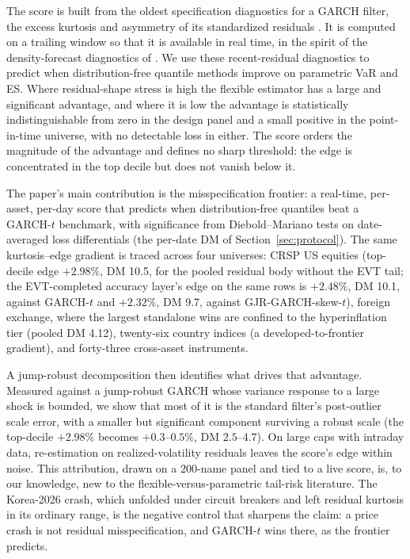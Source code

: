 \documentclass[11pt]{article}
\theoremstyle{remark}
\begin{document}
The score is built from the oldest specification diagnostics for a
GARCH filter, the excess kurtosis and asymmetry of its standardized
residuals \citep{bollerslev1987, hansen1994ARCD}. It is computed on a
trailing window so that it is available in real time, in the spirit of
the density-forecast diagnostics of \citet{berkowitz2001}. We use these recent-residual diagnostics to predict when distribution-free quantile methods improve on parametric VaR and ES. Where residual-shape stress is high the flexible estimator has a large and significant advantage, and where it is low the advantage is statistically indistinguishable from zero in the design panel and a small positive in the point-in-time universe, with no detectable loss in either. The score orders the magnitude of the advantage and defines no sharp threshold: the edge is concentrated in the top decile but does not vanish below it.

\medskip\noindent The paper's main contribution is the misspecification frontier: a real-time, per-asset, per-day score that predicts when distribution-free quantiles beat a GARCH-$t$ benchmark, with significance from Diebold--Mariano tests on date-averaged loss differentials (the per-date DM of Section~\ref{sec:protocol}). The same kurtosis--edge gradient is traced across four universes: CRSP US equities (top-decile edge $+2.98\%$, DM 10.5, for the pooled residual body without the EVT tail; the EVT-completed accuracy layer's edge on the same rows is $+2.48\%$, DM 10.1, against GARCH-$t$ and $+2.32\%$, DM 9.7, against GJR-GARCH-skew-$t$), foreign exchange, where the largest standalone wins are confined to the hyperinflation tier (pooled DM 4.12), twenty-six country indices (a developed-to-frontier gradient), and forty-three cross-asset instruments.

A jump-robust decomposition then identifies what drives that advantage. Measured against a jump-robust GARCH whose variance response to a large shock is bounded, we show that most of it is the standard filter's post-outlier scale error, with a smaller but significant component surviving a robust scale (the top-decile $+2.98\%$ becomes $+0.3$--$0.5\%$, DM $2.5$--$4.7$). On large caps with intraday data, re-estimation on realized-volatility residuals leaves the score's edge within noise. This attribution, drawn on a 200-name panel and tied to a live score, is, to our knowledge, new to the flexible-versus-parametric tail-risk literature. The Korea-2026 crash, which unfolded under circuit breakers and left residual kurtosis in its ordinary range, is the negative control that sharpens the claim: a price crash is not residual misspecification, and GARCH-$t$ wins there, as the frontier predicts.
\end{document}
